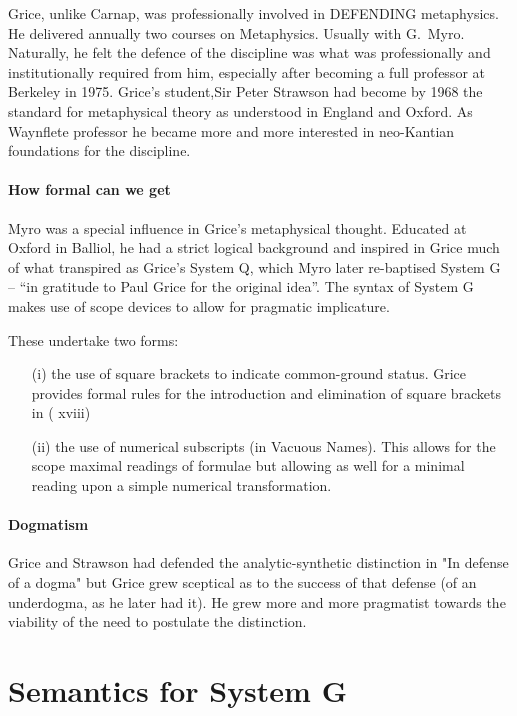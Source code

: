 \documentclass[10pt,titlepage]{book}
\begin{document}
{Grice, unlike Carnap, was professionally involved in DEFENDING metaphysics.
He delivered annually two courses on Metaphysics.
Usually with G.~Myro.
Naturally, he felt the defence of the discipline was what was professionally and institutionally required from him, especially after becoming a full professor at Berkeley in 1975.
Grice's student,Sir Peter Strawson had become by 1968 the standard for metaphysical theory as understood in England and Oxford.
As Waynflete professor he became more and more interested in neo-Kantian foundations for the discipline. 

\paragraph{How formal can we get}

Myro was a special influence in Grice's metaphysical thought.
Educated at Oxford in Balliol, he had a strict logical background and inspired in Grice much of what transpired as Grice's System Q, which Myro later re-baptised System G -- ``in gratitude to Paul Grice for the original idea''.
The syntax of System G makes use of scope devices to allow for pragmatic implicature.

These undertake two forms:

\begin{itemize}
\item[(i)] the use of square brackets to indicate common-ground status.
Grice provides formal rules for the introduction and elimination of square brackets in (\cite{grice89} xviii) 
\item[(ii)] the use of numerical subscripts (in Vacuous Names).
This allows for the scope maximal readings of formulae but allowing as well for a minimal reading upon a simple numerical transformation.  
\end{itemize}

\paragraph{Dogmatism} Grice and Strawson had defended the analytic-synthetic 
distinction in "In  defense of a dogma" but Grice grew sceptical as to the success 
of that defense  (of an underdogma, as he later had it). He grew more and 
more pragmatist towards  the viability of the need to postulate the 
distinction. 

\section{Semantics for System G}

}
\end{document}
